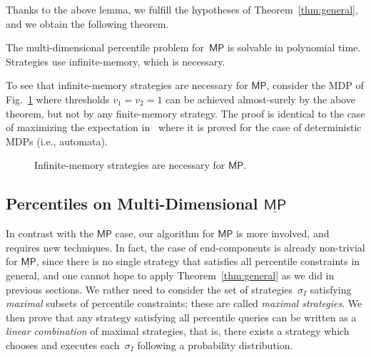 \documentclass{llncs}
\newcommand*{\mpsup}{\ensuremath{\overline{\mathsf{MP}}}}
\newcommand*{\mpinf}{\ensuremath{\underline{\mathsf{MP}}}}
\begin{document}
Thanks to the above lemma, we fulfill the hypotheses of Theorem~\ref{thm:general}, and we obtain the following theorem.

\begin{theorem}
\label{thm:mpsup}
  The multi-dimensional percentile problem for~$\mpsup$
  is solvable in polynomial time. Strategies use infinite-memory, which is necessary.
\end{theorem}


To see that infinite-memory strategies are necessary for $\mpsup$, consider the MDP of Fig.~\ref{fig:mpsup-memory} where thresholds $v_1=v_2=1$ can be achieved almost-surely by the above theorem, but not by any finite-memory strategy. The proof is identical to the case of maximizing the expectation in~\cite[Lemma 7]{CDHR-fsttcs10} where it is proved for the case of deterministic MDPs (i.e., automata).

\begin{figure}[ht]
  \centering
  \caption{Infinite-memory strategies are necessary for $\mpsup$.}
  \label{fig:mpsup-memory}
\end{figure}

\subsection{Percentiles on Multi-Dimensional $\mpinf$}
\label{section:multidim-mpinf}

In contrast with the $\mpsup$ case, our algorithm for $\mpinf$ is more involved, and requires new techniques.
In fact, the case of end-components is already non-trivial for $\mpinf$, since there is no single strategy 
that satisfies all percentile constraints in general, and one cannot hope to apply Theorem~\ref{thm:general} as we did in previous sections.
We rather need to consider the set of strategies~$\sigma_I$ satisfying \emph{maximal} subsets of percentile constraints; these are called \emph{maximal strategies}.
We then prove that any strategy satisfying all percentile queries can be written as a \emph{linear combination} of maximal strategies, that is,
there exists a strategy which chooses and executes each~$\sigma_I$ following a probability distribution.
\end{document}
